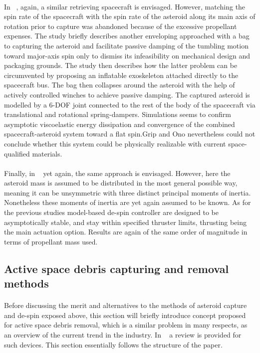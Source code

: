 \paragraph{}In ~\cite{Grip2013}, again, a similar retrieving spacecraft is envisaged. However, matching the spin rate of the spacecraft with the spin rate of the asteroid along its main axis of rotation prior to capture was abandoned because of the excessive propellant expenses. The study briefly describes another enveloping approached with a bag to capturing the asteroid and facilitate passive damping of the tumbling motion toward major-axis spin only to dismiss its infeasibility on mechanical design and packaging grounds. The study then describes how the latter problem can be circumvented by proposing an inflatable exoskeleton attached directly to the spacecraft bus. The bag then collapses around the asteroid with the help of actively controlled winches to achieve passive damping. The captured asteroid is modelled by a 6-DOF joint connected to the rest of the body of the spacecraft via translational and rotational spring-dampers. Simulations seems to confirm asymptotic viscoelastic energy dissipation and convergence of the combined spacecraft-asteroid system toward a flat spin.Grip and Ono nevertheless could not conclude whether this system could be physically realizable with current space-qualified materials.
\paragraph{}Finally, in ~\cite{Shen2014} yet again, the same approach is envisaged. However, here the asteroid mass is assumed to be distributed in the most general possible way, meaning it can be unsymmetric with three distinct principal moments of inertia. Nonetheless these moments of inertia are yet again assumed to be known. As for the previous studies model-based de-spin controller are designed to be asymptotically stable, and stay within specified thruster limits, thrusting being the main actuation option. Results are again of the same order of magnitude in terms of propellant mass used.

\subsection{Active space debris capturing and removal methods}
\paragraph{}Before discussing the merit and alternatives to the methods of asteroid capture and de-spin exposed above, this section will briefly introduce concept proposed for active space debris removal, which is a similar problem in many respects, as an overview of the current trend in the industry. In ~\cite{Shan2016} a review is provided for such devices. This section essentially follows the structure of the paper.
